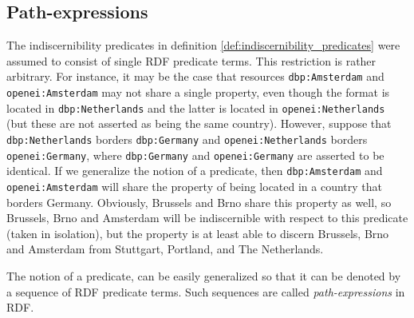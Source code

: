 \subsection{Path-expressions}
\label{sec:path_expressions}

The indiscernibility predicates in
  definition \ref{def:indiscernibility_predicates}
  were assumed to consist of single RDF predicate terms.
This restriction is rather arbitrary.
For instance,
  it may be the case that resources {\small \texttt{dbp:Amsterdam}}
  and {\small \texttt{openei:Amsterdam}} may not share a single property,
  even though the format is located in {\small \texttt{dbp:Netherlands}}
  and the latter is located in {\small \texttt{openei:Netherlands}}
  (but these are not asserted as being the same country).
However, suppose that {\small \texttt{dbp:Netherlands}}
  borders {\small \texttt{dbp:Germany}}
  and {\small \texttt{openei:Netherlands}}
  borders {\small \texttt{openei:Germany}},
  where {\small \texttt{dbp:Germany}} and
  {\small \texttt{openei:Germany}} are asserted to be identical.
If we generalize the notion of a predicate,
  then {\small \texttt{dbp:Amsterdam}} and
  {\small \texttt{openei:Amsterdam}} will share the property
  of being located in a country that borders Germany.
Obviously, Brussels and Brno share this property as well,
  so Brussels, Brno and Amsterdam will be indiscernible with respect to
  this predicate (taken in isolation), but the property is at least
  able to discern Brussels, Brno and Amsterdam from
  Stuttgart, Portland, and The Netherlands.

The notion of a predicate, can be easily generalized
  so that it can be denoted by a sequence of RDF predicate terms.
Such sequences are called \emph{path-expressions} in RDF. 

